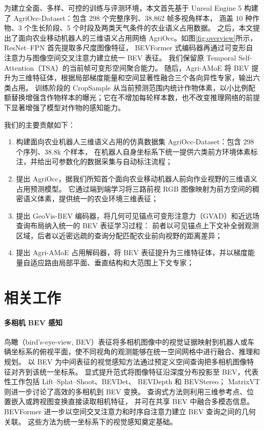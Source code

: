 \documentclass[a4paper,fleqn]{cas-sc}
\begin{document}
为建立全面、多样、可控的训练与评测环境，本文首先基于 Unreal Engine 5 构建了 AgriOcc-Dataset：包含 298 个完整序列、38,862 帧多视角样本，
涵盖 10 种作物、3 个生长阶段、5 个时段及两类天气条件的农业语义占用数据。
之后，本文提出了面向农业移动机器人的三维语义占用网络 AgriOcc。如图\ref{fig:overview}所示，ResNet--FPN 首先提取多尺度图像特征，
BEVFormer  式编码器再通过可变形自注意力与图像空间交叉注意力建立统一 BEV 表征。
我们保留原 Temporal Self-Attention（TSA）的当前帧可变形空间聚合能力。
随后，Agri-AMoE 将 BEV 提升为三维特征体，根据局部梯度能量和空间显著性融合三个各向异性专家，输出六类占用。
训练阶段的 CropSample 从当前预测范围内统计作物体素，以小比例配额替换增强含作物样本的曝光；它在不增加每轮样本数，也不改变推理网络的前提下显著增强了模型对作物的感知能力。

我们的主要贡献如下：
\begin{enumerate}[leftmargin=1.8em]
  \item 构建面向农业机器人三维语义占用的仿真数据集 AgriOcc-Dataset：包含 298 个序列、38.8k 个样本，
        在机器人自身坐标系下统一提供六类前方环境体素标注，并给出可参数化的数据采集与自动标注流程；
  \item 提出 AgriOcc，据我们所知首个面向农业移动机器人前向作业视野的三维语义占用预测模型。
        它通过端到端学习将三路前视 RGB 图像映射为前方空间的稠密语义体素，提供统一的农业环境三维表征；
  \item 提出 GeoVis-BEV 编码器，将几何可见锚点可变形注意力（GVAD）和近远场查询布局纳入统一的 BEV 表征学习过程：
        前者以可见锚点上下文补全弱观测区域，后者以近密远疏的查询分配匹配农业前向视野的距离差异；
  \item 提出 Agri-AMoE 占用解码器，将 BEV 表征提升为三维特征体，并以梯度能量自适应路由局部平面、垂直结构和大范围上下文专家；
\end{enumerate}

\section{相关工作}\label{sec:related}

\paragraph{多相机 BEV 感知}
鸟瞰（bird's-eye-view, BEV）表征将多相机图像中的视觉证据映射到机器人或车辆坐标系的俯视平面，使不同视角的观测能够在统一空间网格中进行融合、推理和规划。
以 BEV 为中间表征的视觉感知方法通过预定义空间查询把多相机图像特征对齐到该统一坐标系。
显式提升范式将图像特征沿深度分布投影至 BEV，代表性工作包括 Lift--Splat--Shoot、BEVDet、
BEVDepth 和 BEVStereo\citep{philion2020lift,huang2021bevdet,li2022bevdepth,li2022bevstereo}；
MatrixVT 则进一步讨论了高效的多相机到 BEV 变换\citep{zhou2022matrixvt}。
查询式方法则利用三维参考点、位置嵌入或跨视图变换直接读取相机特征\citep{wang2022detr3d,li2022petr,liu2023petrv2,li2023fbbev}，
并可在共享 BEV 中融合多模态信息\citep{liu2023bevfusion}。
BEVFormer 进一步以空间交叉注意力和时序自注意力建立 BEV 查询之间的几何关联\citep{li2022bevformer}。
这些方法为统一坐标系下的视觉感知奠定基础。
\end{document}
